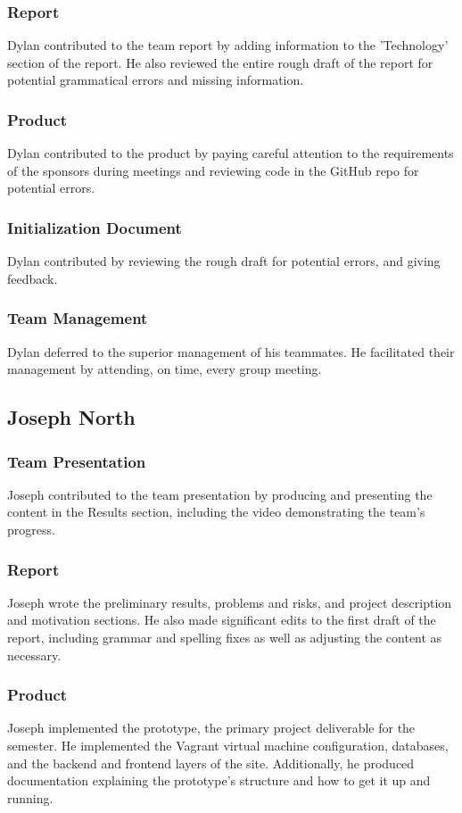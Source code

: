 \documentclass[12pt]{article}
\begin{document}
\begin{spacing}{1.5}
\subsubsection{Report}
Dylan contributed to the team report by adding information to the 'Technology' section of the report.  He also reviewed the entire rough draft of the report for potential grammatical errors and missing information.
\subsubsection{Product}
Dylan contributed to the product by paying careful attention to the requirements of the sponsors during meetings and reviewing code in the GitHub repo for potential errors.
\subsubsection{Initialization Document}
Dylan contributed by reviewing the rough draft for potential errors, and giving feedback. 
\subsubsection{Team Management}
Dylan deferred to the superior management of his teammates.  He facilitated their management by attending, on time, every group meeting.

\clearpage

\subsection{Joseph North}
\subsubsection{Team Presentation}
Joseph contributed to the team presentation by producing and presenting the content in the Results section, including the video demonstrating the team's progress.
\subsubsection{Report}
Joseph wrote the preliminary results, problems and risks, and project description and motivation sections. He also made significant edits to the first draft of the report, including grammar and spelling fixes as well as adjusting the content as necessary.
\subsubsection{Product}
Joseph implemented the prototype, the primary project deliverable for the semester. He implemented the Vagrant virtual machine configuration, databases, and the backend and frontend layers of the site. Additionally, he produced documentation explaining the prototype's structure and how to get it up and running.

\end{spacing}
\end{document}
